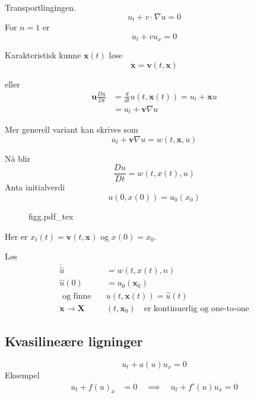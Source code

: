 \documentclass{article}
\newcommand{\incfig}[2][1]{%
\def\svgwidth{#1\columnwidth}
{#2.pdf_tex} } \pdfsuppresswarningpagegroup=1
\theoremstyle{remark}
\begin{document}
\begin{definition}
  Transportlingingen. \[
  u_{t} + v\cdot \nabla u = 0
  \] 
  For $n = 1$ er \[
  u_{t} + v u_{x} = 0
  \] 
\end{definition}

Karakteristisk kunne $\mathbf{x}\left( t \right)$ løse \[
\dot{\mathbf{x}} = \mathbf{v} \left( t, \mathbf{x} \right)
\] 

eller
\[
  \begin{split}
\dot{\mathbf{u}} \frac{Du}{Dt}   & = \frac{d}{dt}  u\left( t, \mathbf{x}\left( t \right) \right) = u_{t} + \dot{\mathbf{x}} u\\
&= u_{t} + \mathbf{v}\nabla u 
  \end{split} 
\] 

Mer generell variant kan skrives som \[
u_{t} + \mathbf{v} \nabla u = w\left( t, \mathbf{x}, u \right)
\]  

Nå blir \[
\frac{Du}{Dt}  = w\left( t,x\left( t \right), u \right)
\] 
Anta initialverdi \[
u\left( 0, x\left( 0 \right) \right) = u_{0} \left( x_{0} \right)
\] 
\begin{figure}[ht]
    \centering
    \incfig{figg}
    \label{fig:figg}
\end{figure}

Her er $x_{t} \left( t \right) = \mathbf{v}\left( t, \mathbf{x} \right)$ og $x\left( 0 \right) = x_{0}$. \par Løs \[
\begin{split}
  \dot{\hat{u}}   & = w\left( t, x\left( t \right), n \right) \\
  \hat{u} \left( 0 \right)  & = u_{0} \left( \mathbf{x}_{0} \right) \\
  \text{ og finne} \quad   & u\left( t, \mathbf{x}\left( t \right) \right) = \hat{u} \left( t \right) \\
  \mathbf{x}    \to \mathbf{X} &\left( t, \mathbf{x}_{0} \right) \quad \text{er kontinuerlig og one-to-one} 
\end{split} 
\] 

\subsection{Kvasilineære ligninger}%
\label{sub:kvasilineaere_ligninger}

\[
u_{t} + a\left( u \right) u_{x} = 0
\] 
Eksempel \[
  \begin{split}
u_{t} + f\left( u \right)_{x}   & = 0  \quad \implies  \quad  u_{t}  + f'\left( u  \right)  u_{x} = 0
  \end{split} 
\] 
\end{document}
